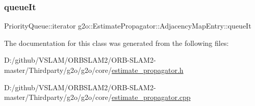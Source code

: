 \subsubsection{\texorpdfstring{queue\+It}{queueIt}}
{\footnotesize\ttfamily Priority\+Queue\+::iterator g2o\+::\+Estimate\+Propagator\+::\+Adjacency\+Map\+Entry\+::queue\+It\hspace{0.3cm}{\ttfamily [private]}}



The documentation for this class was generated from the following files\+:\begin{DoxyCompactItemize}
\item 
D\+:/github/\+V\+S\+L\+A\+M/\+O\+R\+B\+S\+L\+A\+M2/\+O\+R\+B-\/\+S\+L\+A\+M2-\/master/\+Thirdparty/g2o/g2o/core/\mbox{\hyperlink{estimate__propagator_8h}{estimate\+\_\+propagator.\+h}}\item 
D\+:/github/\+V\+S\+L\+A\+M/\+O\+R\+B\+S\+L\+A\+M2/\+O\+R\+B-\/\+S\+L\+A\+M2-\/master/\+Thirdparty/g2o/g2o/core/\mbox{\hyperlink{estimate__propagator_8cpp}{estimate\+\_\+propagator.\+cpp}}\end{DoxyCompactItemize}
